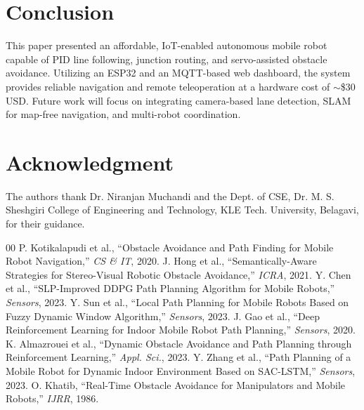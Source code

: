 \documentclass[conference]{IEEEtran}
\begin{document}
\section{Conclusion}
This paper presented an affordable, IoT-enabled autonomous mobile robot capable of PID line following, junction routing, and servo-assisted obstacle avoidance. Utilizing an ESP32 and an MQTT-based web dashboard, the system provides reliable navigation and remote teleoperation at a hardware cost of $\sim$\$30 USD. Future work will focus on integrating camera-based lane detection, SLAM for map-free navigation, and multi-robot coordination.

\section*{Acknowledgment}
The authors thank Dr. Niranjan Muchandi and the Dept. of CSE, Dr. M. S. Sheshgiri College of Engineering and Technology, KLE Tech. University, Belagavi, for their guidance.

\begin{thebibliography}{00}
 P. Kotikalapudi et al., ``Obstacle Avoidance and Path Finding for Mobile Robot Navigation,'' \textit{CS \& IT}, 2020.
 J. Hong et al., ``Semantically-Aware Strategies for Stereo-Visual Robotic Obstacle Avoidance,'' \textit{ICRA}, 2021.
 Y. Chen et al., ``SLP-Improved DDPG Path Planning Algorithm for Mobile Robots,'' \textit{Sensors}, 2023.
 Y. Sun et al., ``Local Path Planning for Mobile Robots Based on Fuzzy Dynamic Window Algorithm,'' \textit{Sensors}, 2023.
 J. Gao et al., ``Deep Reinforcement Learning for Indoor Mobile Robot Path Planning,'' \textit{Sensors}, 2020.
 K. Almazrouei et al., ``Dynamic Obstacle Avoidance and Path Planning through Reinforcement Learning,'' \textit{Appl. Sci.}, 2023.
 Y. Zhang et al., ``Path Planning of a Mobile Robot for Dynamic Indoor Environment Based on SAC-LSTM,'' \textit{Sensors}, 2023.
 O. Khatib, ``Real-Time Obstacle Avoidance for Manipulators and Mobile Robots,'' \textit{IJRR}, 1986.
\end{thebibliography}
\end{document}
